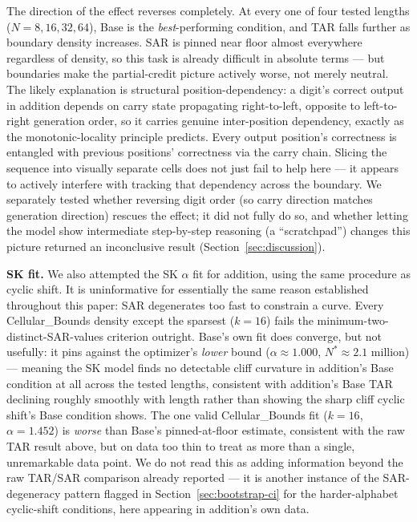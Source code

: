 \documentclass[11pt]{article}
\begin{document}
The direction of the effect reverses completely. At every one of four tested lengths ($N=8, 16, 32, 64$), Base is the \emph{best}-performing condition, and TAR falls further as boundary density increases. SAR is pinned near floor almost everywhere regardless of density, so this task is already difficult in absolute terms --- but boundaries make the partial-credit picture actively worse, not merely neutral. The likely explanation is structural position-dependency: a digit's correct output in addition depends on carry state propagating right-to-left, opposite to left-to-right generation order, so it carries genuine inter-position dependency, exactly as the monotonic-locality principle predicts. Every output position's correctness is entangled with previous positions' correctness via the carry chain. Slicing the sequence into visually separate cells does not just fail to help here --- it appears to actively interfere with tracking that dependency across the boundary. We separately tested whether reversing digit order (so carry direction matches generation direction) rescues the effect; it did not fully do so, and whether letting the model show intermediate step-by-step reasoning (a ``scratchpad'') changes this picture returned an inconclusive result (Section~\ref{sec:discussion}).

\textbf{SK fit.} We also attempted the SK $\alpha$ fit for addition, using the same procedure as cyclic shift. It is uninformative for essentially the same reason established throughout this paper: SAR degenerates too fast to constrain a curve. Every Cellular\_Bounds density except the sparsest ($k=16$) fails the minimum-two-distinct-SAR-values criterion outright. Base's own fit does converge, but not usefully: it pins against the optimizer's \emph{lower} bound ($\alpha\approx1.000$, $N^*\approx2.1$ million) --- meaning the SK model finds no detectable cliff curvature in addition's Base condition at all across the tested lengths, consistent with addition's Base TAR declining roughly smoothly with length rather than showing the sharp cliff cyclic shift's Base condition shows. The one valid Cellular\_Bounds fit ($k=16$, $\alpha=1.452$) is \emph{worse} than Base's pinned-at-floor estimate, consistent with the raw TAR result above, but on data too thin to treat as more than a single, unremarkable data point. We do not read this as adding information beyond the raw TAR/SAR comparison already reported --- it is another instance of the SAR-degeneracy pattern flagged in Section~\ref{sec:bootstrap-ci} for the harder-alphabet cyclic-shift conditions, here appearing in addition's own data.
\end{document}
